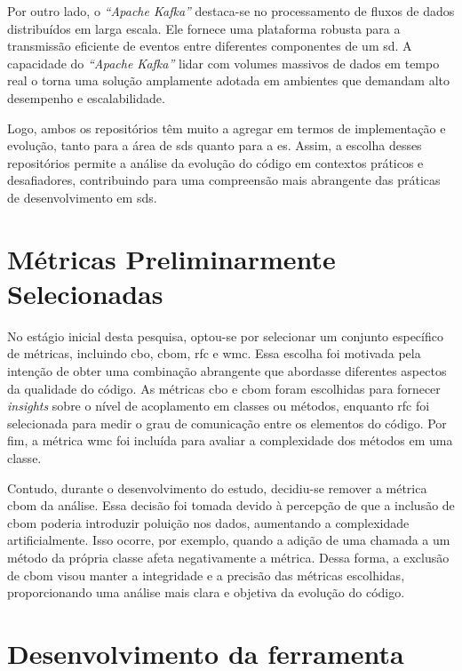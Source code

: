 Por outro lado, o \textit{``Apache Kafka''} destaca-se no processamento de fluxos de dados distribuídos em larga escala. Ele fornece uma plataforma robusta para a transmissão eficiente de eventos entre diferentes componentes de um \gls{sd}. A capacidade do \textit{``Apache Kafka''} lidar com volumes massivos de dados em tempo real o torna uma solução amplamente adotada em ambientes que demandam alto desempenho e escalabilidade.

Logo, ambos os repositórios têm muito a agregar em termos de implementação e evolução, tanto para a área de \gls{sds} quanto para a \gls{es}. Assim, a escolha desses repositórios permite a análise da evolução do código em contextos práticos e desafiadores, contribuindo para uma compreensão mais abrangente das práticas de desenvolvimento em \gls{sds}.

\section{Métricas Preliminarmente Selecionadas}

No estágio inicial desta pesquisa, optou-se por selecionar um conjunto específico de métricas, incluindo \gls{cbo}, \gls{cbom}, \gls{rfc} e \gls{wmc}. Essa escolha foi motivada pela intenção de obter uma combinação abrangente que abordasse diferentes aspectos da qualidade do código. As métricas \gls{cbo} e \gls{cbom} foram escolhidas para fornecer \textit{insights} sobre o nível de acoplamento em classes ou métodos, enquanto \gls{rfc} foi selecionada para medir o grau de comunicação entre os elementos do código. Por fim, a métrica \gls{wmc} foi incluída para avaliar a complexidade dos métodos em uma classe.

Contudo, durante o desenvolvimento do estudo, decidiu-se remover a métrica \gls{cbom} da análise. Essa decisão foi tomada devido à percepção de que a inclusão de \gls{cbom} poderia introduzir poluição nos dados, aumentando a complexidade artificialmente. Isso ocorre, por exemplo, quando a adição de uma chamada a um método da própria classe afeta negativamente a métrica. Dessa forma, a exclusão de \gls{cbom} visou manter a integridade e a precisão das métricas escolhidas, proporcionando uma análise mais clara e objetiva da evolução do código.

\section{Desenvolvimento da ferramenta}

